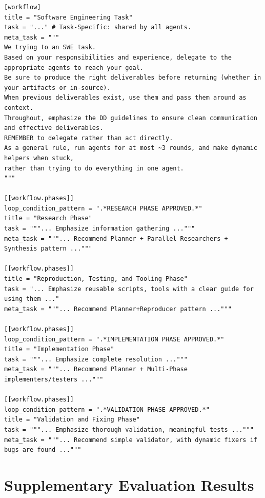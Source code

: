 \begin{listing}[H]
{\tiny
\begin{lstlisting}[rulecolor=\color{accentShell}]
[workflow]
title = "Software Engineering Task"
task = "..." # Task-Specific: shared by all agents.
meta_task = """
We trying to an SWE task.
Based on your responsibilities and experience, delegate to the appropriate agents to reach your goal.
Be sure to produce the right deliverables before returning (whether in your artifacts or in-source).
When previous deliverables exist, use them and pass them around as context.
Throughout, emphasize the DD guidelines to ensure clean communication and effective deliverables.
REMEMBER to delegate rather than act directly.
As a general rule, run agents for at most ~3 rounds, and make dynamic helpers when stuck,
rather than trying to do everything in one agent.
"""

[[workflow.phases]]
loop_condition_pattern = ".*RESEARCH PHASE APPROVED.*"
title = "Research Phase"
task = """... Emphasize information gathering ..."""
meta_task = """... Recommend Planner + Parallel Researchers + Synthesis pattern ..."""

[[workflow.phases]]
title = "Reproduction, Testing, and Tooling Phase"
task = "... Emphasize reusable scripts, tools with a clear guide for using them ..."
meta_task = """... Recommend Planner+Reproducer pattern ..."""

[[workflow.phases]]
loop_condition_pattern = ".*IMPLEMENTATION PHASE APPROVED.*"
title = "Implementation Phase"
task = """... Emphasize complete resolution ..."""
meta_task = """... Recommend Planner + Multi-Phase implementers/testers ..."""

[[workflow.phases]]
loop_condition_pattern = ".*VALIDATION PHASE APPROVED.*"
title = "Validation and Fixing Phase"
task = """... Emphasize thorough validation, meaningful tests ..."""
meta_task = """... Recommend simple validator, with dynamic fixers if bugs are found ..."""
\end{lstlisting}
}
\caption{\sysname max multi-meta agent workflow for advanced software engineering tasks. Each phase has its own meta agent; HIL checkpoints are controlled by \texttt{loop\_condition\_pattern}. This is typically an overkill in small-to-moderate problems, hence the high costs.}
\label{lst:multimeta_workflow}
\end{listing}


\section{Supplementary Evaluation Results}
\label{sec:app_supplementary}

